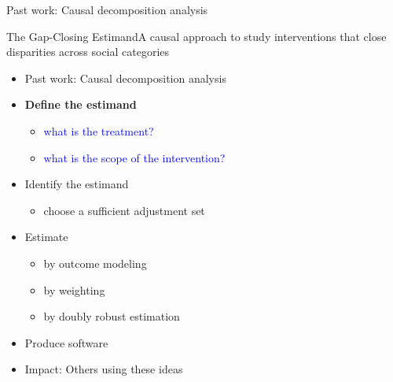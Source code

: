 \documentclass{beamer}
\newcommand\bblue[1]{{\color{blue}\textbf{#1}}}
\begin{document}
{\begin{frame}{Past work: Causal decomposition analysis}
\end{frame}

\begin{frame}{The Gap-Closing Estimand}{A causal approach to study interventions that close disparities across social categories}
	\begin{itemize}
		\item Past work: Causal decomposition analysis
		\item \bblue{Define the estimand}
		\begin{itemize}
			\item \textcolor{blue}{what is the treatment?}
			\item \textcolor{blue}{what is the scope of the intervention?}
		\end{itemize}
		\item Identify the estimand
		\begin{itemize}
			\item choose a sufficient adjustment set
		\end{itemize}
		\item Estimate
		\begin{itemize}
			\item by outcome modeling
			\item by weighting
			\item by doubly robust estimation
		\end{itemize}
		\item Produce software
		\item Impact: Others using these ideas
	\end{itemize}
\end{frame}


}
\end{document}
